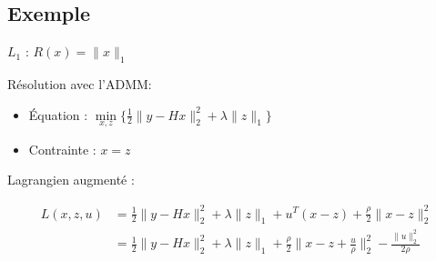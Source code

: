 \subsection{Exemple}

\frame{
    \tableofcontents[ 
        currentsubsection, 
    ]
}

\begin{frame}{$L_{1}$ : $R(x) = \lVert x \rVert_{1}$}

Résolution avec l'ADMM:
\begin{itemize}
    \item Équation : $\min\limits_{x, z} \{ 
        \frac{1}{2} \lVert y - Hx \rVert_{2}^{2} 
        + \lambda \lVert z \rVert_{1} 
    \}$
    \item Contrainte : $x = z$
\end{itemize}

\vspace{5mm}

Lagrangien augmenté :

\begin{align*}
L(x, z, u) 
&= \frac{1}{2} \lVert y - Hx \rVert_{2}^{2} 
+ \lambda \lVert z \rVert_{1} 
+ u^{T}(x-z) + \frac{\rho}{2} \lVert x-z \rVert_{2}^{2} \\
&= \frac{1}{2} \lVert y - Hx \rVert_{2}^{2} 
+ \lambda \lVert z \rVert_{1}
+ \frac{\rho}{2} \lVert x - z + \frac{u}{\rho} \rVert_{2}^{2} 
- \frac{\lVert u \rVert_{2}^{2}}{2\rho}    
\end{align*}

\end{frame}

